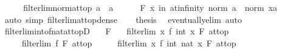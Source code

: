 \begin{isabellebody}
%
\isadelimproof
%
\endisadelimproof
%
\isatagproof
{}\isamarkupfalse%
\ {\isacharminus}{\kern0pt}\isanewline
\ \ \isamarkupfalse%
\ filterlim{\isacharunderscore}{\kern0pt}norm{\isacharunderscore}{\kern0pt}at{\isacharunderscore}{\kern0pt}top{\isacharbrackleft}{\kern0pt}\ {\isacharprime}{\kern0pt}a\ {\isacharequal}{\kern0pt}\ {\isacharprime}{\kern0pt}a{\isacharbrackright}{\kern0pt}\isanewline
\ \ \ \ \isamarkupfalse%
\ {\isachardoublequoteopen}{\isasymforall}\isactrlsub F\ x\ in\ at{\isacharunderscore}{\kern0pt}infinity{\isachardot}{\kern0pt}\ norm\ a\ {\isacharless}{\kern0pt}\ norm\ {\isacharparenleft}{\kern0pt}x{\isacharcolon}{\kern0pt}{\isacharcolon}{\kern0pt}{\isacharprime}{\kern0pt}a{\isacharparenright}{\kern0pt}{\isachardoublequoteclose}\ \isamarkupfalse%
\ {\isacharparenleft}{\kern0pt}auto\ simp{\isacharcolon}{\kern0pt}\ filterlim{\isacharunderscore}{\kern0pt}at{\isacharunderscore}{\kern0pt}top{\isacharunderscore}{\kern0pt}dense{\isacharparenright}{\kern0pt}\isanewline
\ \ \isamarkupfalse%
\ {\isacharquery}{\kern0pt}thesis\ \isamarkupfalse%
\ eventually{\isacharunderscore}{\kern0pt}elim\ auto\isanewline
{}\isamarkupfalse%
%
\endisatagproof
{\isafoldproof}%
%
\isadelimproof
\isanewline
%
\endisadelimproof
\isanewline
{}\isamarkupfalse%
\ filterlim{\isacharunderscore}{\kern0pt}int{\isacharunderscore}{\kern0pt}of{\isacharunderscore}{\kern0pt}nat{\isacharunderscore}{\kern0pt}at{\isacharunderscore}{\kern0pt}topD{\isacharcolon}{\kern0pt}\isanewline
\ \ \ F\isanewline
\ \ \ {\isachardoublequoteopen}filterlim\ {\isacharparenleft}{\kern0pt}{\isasymlambda}x{\isachardot}{\kern0pt}\ f\ {\isacharparenleft}{\kern0pt}int\ x{\isacharparenright}{\kern0pt}{\isacharparenright}{\kern0pt}\ F\ at{\isacharunderscore}{\kern0pt}top{\isachardoublequoteclose}\isanewline
\ \ \ \ \ {\isachardoublequoteopen}filterlim\ f\ F\ at{\isacharunderscore}{\kern0pt}top{\isachardoublequoteclose}\isanewline
%
\isadelimproof
%
\endisadelimproof
%
\isatagproof
{}\isamarkupfalse%
\ {\isacharminus}{\kern0pt}\isanewline
\ \ \isamarkupfalse%
\ {\isachardoublequoteopen}filterlim\ {\isacharparenleft}{\kern0pt}{\isasymlambda}x{\isachardot}{\kern0pt}\ f\ {\isacharparenleft}{\kern0pt}int\ {\isacharparenleft}{\kern0pt}nat\ x{\isacharparenright}{\kern0pt}{\isacharparenright}{\kern0pt}{\isacharparenright}{\kern0pt}\ F\ at{\isacharunderscore}{\kern0pt}top{\isachardoublequoteclose}\isanewline

\end{isabellebody}
